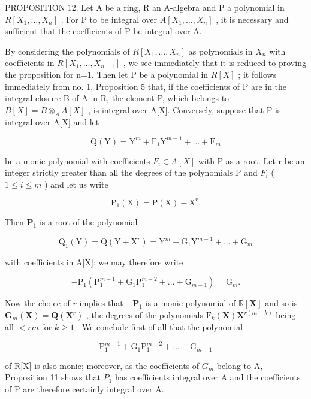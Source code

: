 PROPOSITION 12. Let A be a ring, R an A-algebra and P a polynomial in \(R[X_{1},\ldots,X_{n}]\) . For P to be integral over \(A[X_{1},\ldots,X_{n}]\) , it is necessary and sufficient that the coefficients of P be integral over A.

By considering the polynomials of \(R[X_{1},\ldots,X_{n}]\) as polynomials in \(X_{n}\) with coefficients in \(R[X_{1},\ldots,X_{n-1}]\) , we see immediately that it is reduced to proving the proposition for n=1. Then let P be a polynomial in \(R[X]\) ; it follows immediately from no. 1, Proposition 5 that, if the coefficients of P are in the integral closure B of A in R, the element P, which belongs to \(B[X]=B\otimes_{A}A[X]\) , is integral over A{[}X{]}. Conversely, suppose that P is integral over A{[}X{]} and let

\[
\mathrm{Q} (\mathrm{Y}) = \mathrm{Y} ^ {m} + \mathrm{F} _ {1} \mathrm{Y} ^ {m - 1} + \dots + \mathrm{F} _ {m}
\]

be a monic polynomial with coefficients \(F_{i} \in A[X]\) with P as a root. Let r be an integer strictly greater than all the degrees of the polynomials P and \(F_{i}\) ( \(1 \leqslant i \leqslant m\) ) and let us write

\[
\mathrm{P} _ {1} (\mathrm{X}) = \mathrm{P} (\mathrm{X}) - \mathrm{X} ^ {r}.
\]

Then \(\mathbf{P}_1\) is a root of the polynomial

\[
\mathrm{Q} _ {1} (\mathrm{Y}) = \mathrm{Q} (\mathrm{Y} + \mathrm{X} ^ {r}) = \mathrm{Y} ^ {m} + \mathrm{G} _ {1} \mathrm{Y} ^ {m - 1} + \dots + \mathrm{G} _ {m}
\]

with coefficients in A{[}X{]}; we may therefore write

\[
- \mathrm{P} _ {1} (\mathrm{P} _ {1} ^ {m - 1} + \mathrm{G} _ {1} \mathrm{P} _ {1} ^ {m - 2} + \dots + \mathrm{G} _ {m - 1}) = \mathrm{G} _ {m}.\tag{1}
\]

Now the choice of \(r\) implies that \(-\mathbf{P}_1\) is a monic polynomial of \(\mathbb{R}[\mathbf{X}]\) and so is \(\mathbf{G}_m(\mathbf{X}) = \mathbf{Q}(\mathbf{X}^r)\) , the degrees of the polynomials \(\mathrm{F}_k(\mathbf{X})\mathbf{X}^{r(m - k)}\) being all \(< rm\) for \(k \geqslant 1\) . We conclude first of all that the polynomial

\[
\mathrm{P} _ {1} ^ {m - 1} + \mathrm{G} _ {1} \mathrm{P} _ {1} ^ {m - 2} + \dots + \mathrm{G} _ {m - 1}
\]

of R{[}X{]} is also monic; moreover, as the coefficients of \(G_{m}\) belong to A, Proposition 11 shows that \(P_{1}\) has coefficients integral over A and the coefficients of P are therefore certainly integral over A.

